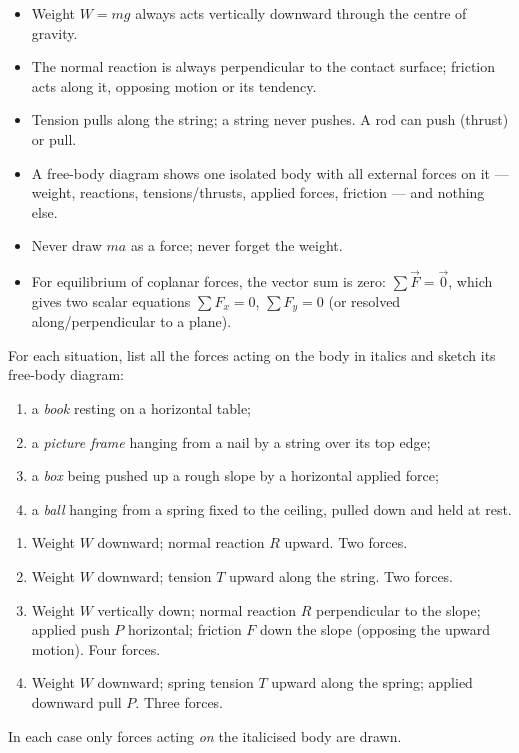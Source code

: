 \documentclass[11pt]{article}
\begin{document}
\begin{aretenir}
\begin{itemize}
\item Weight $W = mg$ always acts vertically downward through the centre of gravity.
\item The normal reaction is always perpendicular to the contact surface; friction acts along it, opposing motion or its tendency.
\item Tension pulls along the string; a string never pushes. A rod can push (thrust) or pull.
\item A free-body diagram shows one isolated body with all external forces on it — weight, reactions, tensions/thrusts, applied forces, friction — and nothing else.
\item Never draw $ma$ as a force; never forget the weight.
\item For equilibrium of coplanar forces, the vector sum is zero: $\sum \vec{F} = \vec{0}$, which gives two scalar equations $\sum F_x = 0$, $\sum F_y = 0$ (or resolved along/perpendicular to a plane).
\end{itemize}
\end{aretenir}

\begin{exercice}
For each situation, list all the forces acting on the body in italics and sketch its free-body diagram:
\begin{enumerate}
\item a \emph{book} resting on a horizontal table;
\item a \emph{picture frame} hanging from a nail by a string over its top edge;
\item a \emph{box} being pushed up a rough slope by a horizontal applied force;
\item a \emph{ball} hanging from a spring fixed to the ceiling, pulled down and held at rest.
\end{enumerate}
\end{exercice}

\begin{corrige}[Exercise 1]
\begin{enumerate}
\item Weight $W$ downward; normal reaction $R$ upward. Two forces.
\item Weight $W$ downward; tension $T$ upward along the string. Two forces.
\item Weight $W$ vertically down; normal reaction $R$ perpendicular to the slope; applied push $P$ horizontal; friction $F$ down the slope (opposing the upward motion). Four forces.
\item Weight $W$ downward; spring tension $T$ upward along the spring; applied downward pull $P$. Three forces.
\end{enumerate}
In each case only forces acting \emph{on} the italicised body are drawn.
\end{corrige}
\end{document}
